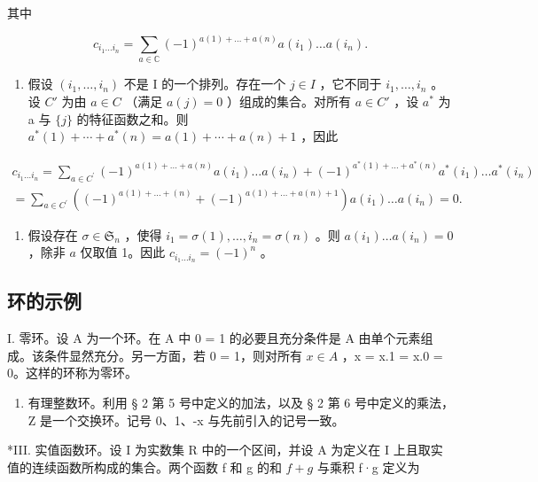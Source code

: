 其中

\[
c _ {i _ {1} \dots i _ {n}} = \sum_ {a \in \mathbb {C}} (- 1) ^ {a (1) + \dots + a (n)} a (i _ {1}) \dots a (i _ {n}).
\]

\begin{enumerate}
\def\labelenumi{(\arabic{enumi})}
\tightlist
\item
  假设 \((i_{1},\ldots,i_{n})\) 不是 I 的一个排列。存在一个 \(j\in I\) ，它不同于 \(i_{1},\ldots,i_{n}\) 。设 \(C'\) 为由 \(a\in C\) （满足 \(a(j)=0\) ）组成的集合。对所有 \(a\in C'\) ，设 \(a^{*}\) 为 a 与 \(\{j\}\) 的特征函数之和。则 \(a^{*}(1)+\cdots+a^{*}(n)=a(1)+\cdots+a(n)+1\) ，因此
\end{enumerate}

\[
\begin{array}{l} c _ {i _ {1} \dots i _ {n}} = \sum_ {a \in C ^ {\prime}} (- 1) ^ {a (1) + \dots + a (n)} a (i _ {1}) \dots a (i _ {n}) + (- 1) ^ {a ^ {*} (1) + \dots + a ^ {*} (n)} a ^ {*} (i _ {1}) \dots a ^ {*} (i _ {n}) \\ = \sum_ {a \in C ^ {\prime}} ((- 1) ^ {a (1) + \dots + (n)} + (- 1) ^ {a (1) + \dots + a (n) + 1}) a (i _ {1}) \dots a (i _ {n}) = 0. \end{array}
\]

\begin{enumerate}
\def\labelenumi{(\arabic{enumi})}
\setcounter{enumi}{1}
\tightlist
\item
  假设存在 \(\sigma \in \mathfrak{S}_n\) ，使得 \(i_1 = \sigma(1), \ldots, i_n = \sigma(n)\) 。则 \(a(i_1) \ldots a(i_n) = 0\) ，除非 \(a\) 仅取值 1。因此 \(c_{i_1 \ldots i_n} = (-1)^n\) 。
\end{enumerate}

\subsection{环的示例}

I. 零环。设 A 为一个环。在 A 中 0 = 1 的必要且充分条件是 A 由单个元素组成。该条件显然充分。另一方面，若 0 = 1，则对所有 \(x \in A\) ，x = x.1 = x.0 = 0。这样的环称为零环。

\begin{enumerate}
\def\labelenumi{\Roman{enumi}.}
\setcounter{enumi}{1}
\tightlist
\item
  有理整数环。利用 § 2 第 5 号中定义的加法，以及 § 2 第 6 号中定义的乘法，Z 是一个交换环。记号 0、1、-x 与先前引入的记号一致。
\end{enumerate}

*III. 实值函数环。设 I 为实数集 R 中的一个区间，并设 A 为定义在 I 上且取实值的连续函数所构成的集合。两个函数 f 和 g 的和 \(f + g\) 与乘积 f·g 定义为

